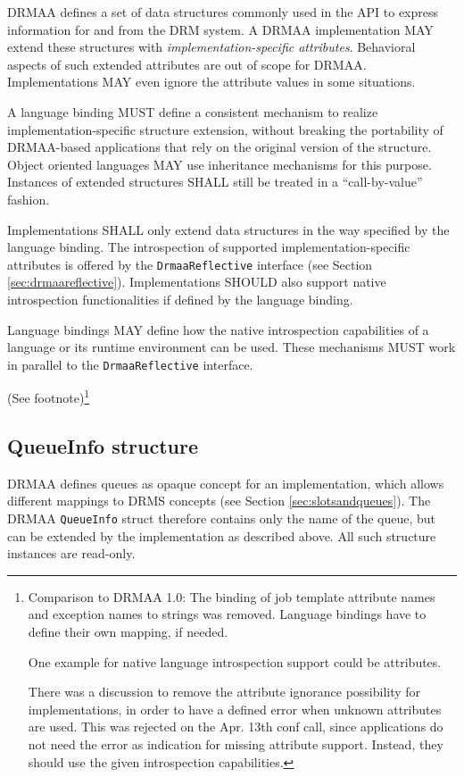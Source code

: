 \documentclass{article}
\newcommand{\h}[1]{\lstinline|#1|}
\newcommand{\langbind}[1]{\begin{shaded}#1\end{shaded}}
\newcommand{\rat}[1]{ {\tiny(See footnote)}\footnote{#1} }
\begin{document}
DRMAA defines a set of data structures commonly used in the API to express information for and from the DRM system. A DRMAA implementation MAY extend these structures with \emph{implementation-specific attributes}. Behavioral aspects of such extended attributes are out of scope for DRMAA. Implementations MAY even ignore the attribute values in some situations.

\langbind{
A language binding MUST define a consistent mechanism to realize implementation-specific structure extension, without breaking the portability of DRMAA-based applications that rely on the original version of the structure. Object oriented languages MAY use inheritance mechanisms for this purpose. Instances of extended structures SHALL still be treated in a \enquote{call-by-value} fashion. 
}

Implementations SHALL only extend data structures in the way specified by the language binding. The introspection of supported implementation-specific attributes is offered by the \h{DrmaaReflective} interface (see Section \ref{sec:drmaareflective}). Implementations SHOULD also support native introspection functionalities if defined by the language binding.

\langbind{
Language bindings MAY define how the native introspection capabilities of a language or its runtime environment can be used. These mechanisms MUST work in parallel to the \h{DrmaaReflective} interface.
}

\rat{
Comparison to DRMAA 1.0: The binding of job template attribute names and exception names to strings was removed. Language bindings have to define their own mapping, if needed. 

One example for native language introspection support could be attributes.

There was a discussion to remove the attribute ignorance possibility for implementations, in order to have a defined error when unknown attributes are used. This was rejected on the Apr. 13th conf call, since applications do not need the error as indication for missing attribute support. Instead, they should use the given introspection capabilities.
}

\subsection{QueueInfo structure}
\label{sec:queue}

DRMAA defines queues as opaque concept for an implementation, which allows different mappings to DRMS concepts (see Section \ref{sec:slotsandqueues}). The DRMAA \h{QueueInfo} struct therefore contains only the name of the queue, but can be extended by the implementation as described above. All such structure instances are read-only.
\end{document}
